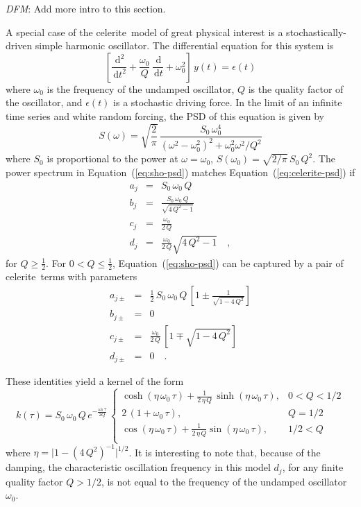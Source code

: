\documentclass[manuscript, letterpaper]{aastex6}
\newcommand{\project}[1]{\textsf{#1}}
\newcommand{\celerite}{\project{celerite}}
\renewcommand{\eqref}[1]{\ref{eq:#1}}
\newcommand{\Eq}[1]{Equation~(\eqref{#1})}
\newcommand{\eq}[1]{\Eq{#1}}
\newcommand{\eqlabel}[1]{\label{eq:#1}}
\newcommand{\dd}{\ensuremath{\,\mathrm{d}}}
\newcommand{\todo}[3]{{\color{#2}\emph{#1}: #3}}
\newcommand{\dfmtodo}[1]{\todo{DFM}{red}{#1}}
\begin{document}
\dfmtodo{Add more intro to this section.}

A special case of the \celerite\ model of great physical interest is a
stochastically-driven simple harmonic oscillator.
The differential equation for this system is
\begin{equation}
    \left[\frac{\dd^2}{\dd t^2} + \frac{\omega_0}{Q}\,\frac{\dd}{\dd t}
    + \omega_0^2\right]\, y(t) = \epsilon(t)
\end{equation}
where $\omega_0$ is the frequency of the undamped oscillator, $Q$ is the
quality factor of the oscillator, and $\epsilon(t)$ is a stochastic driving
force.
In the limit of an infinite time series and white random forcing, the PSD of
this equation is given by \citep{Anderson:1990}
\begin{equation}\eqlabel{sho-psd}
S(\omega) = \sqrt{\frac{2}{\pi}}\,\frac{S_0\,\omega_0^4}
    {(\omega^2-\omega_0^2)^2 + \omega_0^2\omega^2/Q^2}
\end{equation}
where $S_0$ is proportional to the power at $\omega = \omega_0$, $S(\omega_0)
= \sqrt{2/\pi}\,S_0\,Q^2$.
The power spectrum in \eq{sho-psd} matches \eq{celerite-psd} if
\begin{eqnarray}\eqlabel{sho-complex}
a_j &=& S_0\,\omega_0\,Q \\
b_j &=& \frac{S_0\,\omega_0\,Q}{\sqrt{4\,Q^2-1}} \\
c_j &=& \frac{\omega_0}{2\,Q}\\
d_j &=& \frac{\omega_0}{2\,Q} \sqrt{4\,Q^2-1} \quad,
\end{eqnarray}
for $Q \ge \frac{1}{2}$.
For $0 < Q \le \frac{1}{2}$, \eq{sho-psd} can be captured by a pair of \celerite\
terms with parameters
\begin{eqnarray}\eqlabel{sho-real}
a_{j\pm} &=& \frac{1}{2}\,S_0\,\omega_0\,Q\,\left[ 1 \pm
        \frac{1}{\sqrt{1-4\,Q^2}}\right] \\
b_{j\pm} &=& 0 \nonumber\\
    c_{j\pm} &=& \frac{\omega_0}{2\,Q}\,\left[1 \mp \sqrt{1-4\,Q^2}\right]
    \nonumber\\
d_{j\pm} &=& 0 \quad. \nonumber
\end{eqnarray}

These identities yield a kernel of the form
\begin{equation}\eqlabel{sho-kernel}
k(\tau) = S_0\,\omega_0\,Q\,e^{-\frac{\omega_0\,\tau}{2Q}}\,
\begin{cases}
    \cosh{(\eta\,\omega_0\,\tau)} +
        \frac{1}{2\,\eta\,Q}\,\sinh{(\eta\,\omega_0\,\tau)}, & 0 < Q < 1/2\\
    2\,(1+\omega_0\,\tau), & Q = 1/2\\
    \cos{(\eta\,\omega_0\,\tau)} +
        \frac{1}{2\,\eta\,Q} \sin{(\eta\,\omega_0\,\tau)},& 1/2 < Q\\
\end{cases}
\end{equation}
where $\eta = \vert 1-(4\,Q^2)^{-1}\vert^{1/2}$.
It is interesting to note that, because of the damping, the characteristic
oscillation frequency in this model $d_j$, for any finite quality factor $Q > 1/2$,
is not equal to the frequency of the undamped oscillator $\omega_0$.
\end{document}
